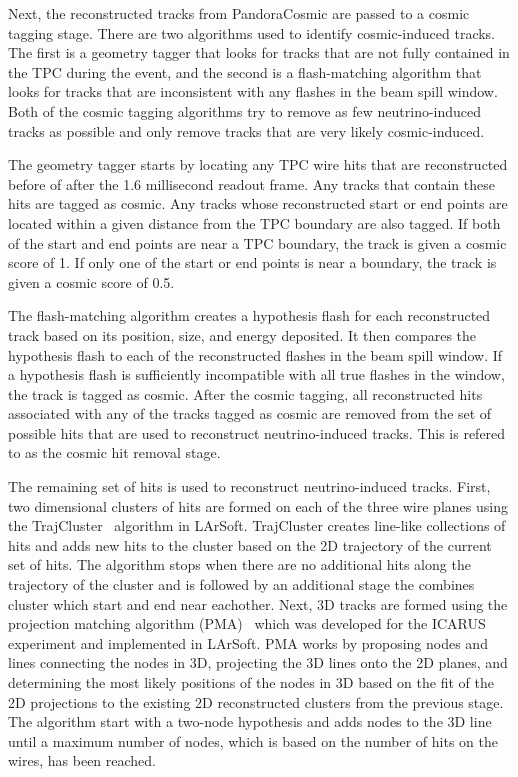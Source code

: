     Next, the reconstructed tracks from PandoraCosmic are passed to a cosmic
    tagging stage. There are two algorithms used to identify cosmic-induced
    tracks. The first is a geometry tagger that looks for tracks that are not
    fully contained in the TPC during the event, and the second is a
    flash-matching algorithm that looks for tracks that are inconsistent with
    any flashes in the beam spill window. Both of the cosmic tagging algorithms
    try to remove as few neutrino-induced tracks as possible and only remove
    tracks that are very likely cosmic-induced.
    
    The geometry tagger starts by locating any TPC wire hits that are
    reconstructed before of after the 1.6 millisecond readout frame. Any tracks
    that contain these hits are tagged as cosmic. Any tracks whose
    reconstructed start or end points are located within a given distance from
    the TPC boundary are also tagged. If both of the start and end points are
    near a TPC boundary, the track is given a cosmic score of 1. If only one of
    the start or end points is near a boundary, the track is given a cosmic
    score of 0.5.
    
    The flash-matching algorithm creates a hypothesis flash for each
    reconstructed track based on its position, size, and energy deposited. It
    then compares the hypothesis flash to each of the reconstructed flashes in
    the beam spill window. If a hypothesis flash is sufficiently incompatible
    with all true flashes in the window, the track is tagged as cosmic. After
    the cosmic tagging, all reconstructed hits associated with any of the
    tracks tagged as cosmic are removed from the set of possible hits that are
    used to reconstruct neutrino-induced tracks. This is refered to as the
    cosmic hit removal stage.

    The remaining set of hits is used to reconstruct neutrino-induced tracks.
    First, two dimensional clusters of hits are formed on each of the three
    wire planes using the TrajCluster~\cite{trajcluster} algorithm in
    LArSoft. TrajCluster creates line-like collections of hits and adds new
    hits to the cluster based on the 2D trajectory of the current set of hits.
    The algorithm stops when there are no additional hits along the trajectory
    of the cluster and is followed by an additional stage the combines cluster
    which start and end near eachother. Next, 3D tracks are formed using the
    projection matching algorithm (PMA)~\cite{PMAIcarus} which was developed
    for the ICARUS experiment and implemented in LArSoft. PMA works by
    proposing nodes and lines connecting the nodes in 3D, projecting the 3D
    lines onto the 2D planes, and determining the most likely positions of the
    nodes in 3D based on the fit of the 2D projections to the existing 2D
    reconstructed clusters from the previous stage. The algorithm start with a
    two-node hypothesis and adds nodes to the 3D line until a maximum number of
    nodes, which is based on the number of hits on the wires, has been reached.

